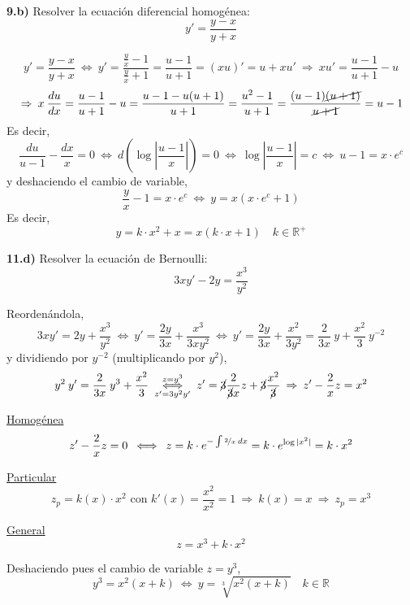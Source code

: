 \begin{ejer}
    \textbf{9.b)} Resolver la ecuación diferencial homogénea:
    $$y'=\dfrac{y-x}{y+x}$$
\end{ejer}
\begin{sol}
    $$y'=\dfrac{y-x}{y+x} \: \iff \:  y'=\dfrac{\frac{y}{x}-1}{\frac{y}{x}+1}=\dfrac{u-1}{u+1}=(xu)'=u+xu' \: \Rightarrow \: xu'=\dfrac{u-1}{u+1}-u$$
    $$\: \Rightarrow \: x \: \dfrac{du}{dx}=\dfrac{u-1}{u+1}-u =\dfrac{u-1-u(u+1)}{u+1}=\dfrac{u^2-1}{u+1}=\dfrac{(u-1)\cancel{(u+1)}}{\cancel{u+1}}=u-1$$
    Es decir, 
    $$\dfrac{du}{u-1}-\dfrac{dx}{x}=0 \: \iff \: d \left( \log\left|\dfrac{u-1}{x}\right|\right)=0\: \iff \: \log\left|\dfrac{u-1}{x}\right|=c \: \iff \: u-1=x \cdot e^c $$
    y deshaciendo el cambio de variable,
    $$\dfrac{y}{x}-1=x \cdot e^c \: \iff \: y=x(x \cdot e^c+1)$$
    Es decir,
    $$\boxed{y=k\cdot x^2+x=x(k\cdot x+1)} \quad k \in \mathbb R^+$$
\end{sol}
\begin{ejer}
    \textbf{11.d)} Resolver la ecuación de Bernoulli:
    $$3xy'-2y=\dfrac{x^3}{y^2}$$
\end{ejer}
\begin{sol}
    Reordenándola,
    $$3xy'=2y+\dfrac{x^3}{y^2} \: \iff \: y'=\dfrac{2y}{3x}+\dfrac{x^3}{3xy^2} \: \iff \: y'=\dfrac{2y}{3x}+\dfrac{x^2}{3y^2}=\dfrac{2}{3x}\: y + \dfrac{x^2}{3} \: y^{-2}$$
    y dividiendo por $y^{-2}$ (multiplicando por $y^2$),
    $$y^2 \: y'=\dfrac{2}{3x} \: y^3 + \dfrac{x^2}{3} \: \underset{z'=3y^2y'}{\overset{z=y^3}{\iff}} \: z'=\cancel{3}\dfrac{2}{\cancel{3}x} z + \cancel{3}\dfrac{x^2}{\cancel{3}} \: \Rightarrow \: z'-\dfrac{2}{x}z=x^2$$

    \underline{Homogénea}
    $$z'-\dfrac{2}{x}z=0 \: \iff \: z=k\cdot e^{-\int \nicefrac{2}{x} \: dx}=k \cdot e^{\log|x^2|}=k \cdot x^2$$

    \underline{Particular}
    $$z_p=k(x)\cdot x^2 \text{ con } k'(x)=\dfrac{x^2}{x^2}=1 \: \Rightarrow \: k(x)=x \: \Rightarrow \: z_p=x^3$$

    \underline{General}
    $$\boxed{z=x^3+k \cdot x^2}$$

    Deshaciendo pues el cambio de variable $z=y^3$, 
    $$y^3=x^2(x+k) \: \iff \: \boxed{y=\sqrt[3]{x^2(x+k)}} \quad k \in \mathbb R$$
\end{sol}

